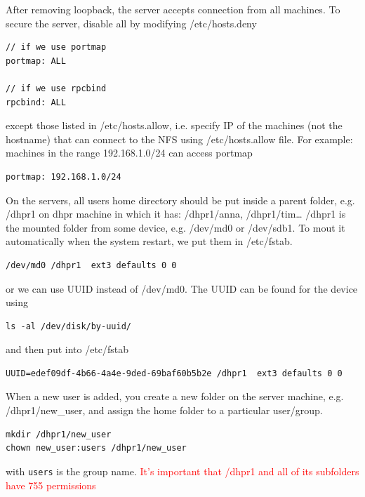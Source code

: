 After removing loopback, the server accepts connection from all machines. To
secure the server, disable all by modifying /etc/hosts.deny
\begin{verbatim}
// if we use portmap
portmap: ALL

// if we use rpcbind 
rpcbind: ALL
\end{verbatim}
except those listed in /etc/hosts.allow, i.e. specify IP of the machines (not
the hostname) that can connect to the NFS using /etc/hosts.allow file. For
example: machines in the range 192.168.1.0/24 can access portmap
\begin{verbatim}
portmap: 192.168.1.0/24
\end{verbatim}

On the servers, all users home directory should be put inside a parent folder,
e.g. /dhpr1 on dhpr machine in which it has: /dhpr1/anna, /dhpr1/tim\ldots
/dhpr1 is the mounted folder from some device, e.g.
/dev/md0 or /dev/sdb1. To mout it automatically when the system restart, we put
them in /etc/fstab.
\begin{verbatim}
/dev/md0 /dhpr1  ext3 defaults 0 0
\end{verbatim}
or we can use UUID instead of /dev/md0. The UUID can be found for the device
using 
\begin{verbatim}
ls -al /dev/disk/by-uuid/
\end{verbatim}
and then put into /etc/fstab
{\small
\begin{verbatim}
UUID=edef09df-4b66-4a4e-9ded-69baf60b5b2e /dhpr1  ext3 defaults 0 0 
\end{verbatim}
}

\begin{framed}
When a new user is added, you create a new folder on the server machine, e.g.
/dhpr1/new\_user, and assign the home folder to a particular user/group.
\begin{verbatim}
mkdir /dhpr1/new_user
chown new_user:users /dhpr1/new_user
\end{verbatim}
with \verb!users! is the group name. \textcolor{red}{It's important that /dhpr1
and all of its subfolders have 755 permissions }
\end{framed}

